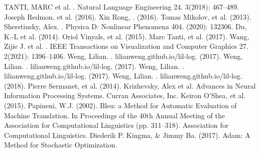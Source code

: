 \begin{thebibliography}{}
 TANTI, MARC et al. . Natural Language Engineering 24. 3(2018): 467–489.
Joseph Redmon, et al.  (2016).
Xin Rong, .  (2016).
Tomas Mikolov, et al.  (2013).
Sherstinsky, Alex. . Physica D: Nonlinear Phenomena 404. (2020): 132306.
Du, K.-L et al.  (2014). 
Oriol Vinyals, et al.  (2015).
Marc Tanti, et al.  (2017).
Wang, Zijie J. et al. . IEEE Transactions on Visualization and Computer Graphics 27. 2(2021): 1396–1406.
Weng, Lilian. . lilianweng.github.io/lil-log. (2017).
Weng, Lilian. . lilianweng.github.io/lil-log. (2017).
Weng, Lilian. . lilianweng.github.io/lil-log. (2017).
Weng, Lilian. . lilianweng.github.io/lil-log. (2018).
Pierre Sermanet, et al.  (2014).
Krizhevsky, Alex et al.  Advances in Neural Information Processing Systems. Curran Associates, Inc.
Keiron O'Shea, et al.  (2015).
 Papineni, W.J. (2002). Bleu: a Method for Automatic Evaluation of Machine Translation. In Proceedings of the 40th Annual Meeting of the Association for Computational Linguistics (pp. 311–318). Association for Computational Linguistics.
 Diederik P. Kingma, & Jimmy Ba. (2017). Adam: A Method for Stochastic Optimization. 

\end{thebibliography}
